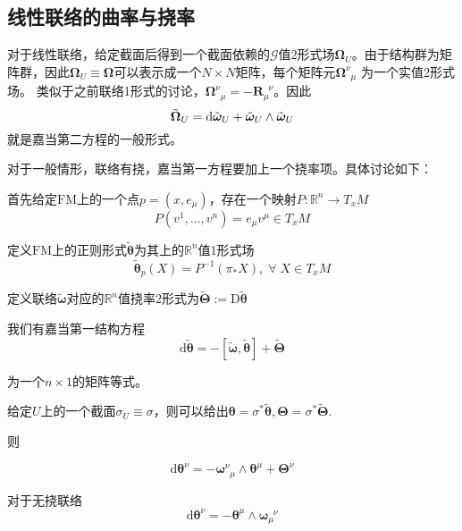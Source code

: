 \documentclass{ctexbook}
\begin{document}
\subsection{线性联络的曲率与挠率}

对于线性联络，给定截面后得到一个截面依赖的$\mathscr{G}$值2形式场$\bm{\Omega}_U$。由于结构群为矩阵群，因此$\bm{\Omega}_U\equiv\bm{\Omega}$可以表示成一个$N\times N$矩阵，每个矩阵元$\bm{\Omega}^{\nu}_{\;\;\mu}$ 为一个实值2形式场。 类似于之前联络1形式的讨论，$\bm{\Omega}^{\nu}_{\;\;\mu}=-\bm{R}_{\mu}^{\;\;\nu}$。因此
\[\tilde{\bm{\Omega}}_U=\mathrm{d}\tilde{\bm{\omega}}_U+\tilde{\bm{\omega}}_U\wedge\tilde{\bm{\omega}}_U\\\]就是嘉当第二方程的一般形式。

对于一般情形，联络有挠，嘉当第一方程要加上一个挠率项。具体讨论如下：

首先给定$\mathrm{FM}$上的一个点$p=(x,e_\mu)$，存在一个映射$P\colon\mathbb{R}^n\to T_x M$
\begin{equation}
    P(v^1,\dots,v^n)=e_\mu v^\mu\in T_x M
\end{equation}

定义$\mathrm{FM}$上的正则形式$\tilde{\bm{\theta}}$为其上的$\mathbb{R}^n$值1形式场
\begin{equation}
    \tilde{\bm{\theta}}_p(X)=P^{-1}(\pi_*X),\;\forall\;X\in T_x M
\end{equation}

定义联络$\tilde{\bm{\omega}}$对应的$\mathbb{R}^n$值挠率2形式为$\tilde{\bm{\Theta}}:=\mathrm{D}\tilde{\bm{\theta}}$

我们有嘉当第一结构方程
\begin{equation}
    \mathrm{d}\tilde{\bm{\theta}}=-\left[\tilde{\bm{\omega}},\tilde{\bm{\theta}}\right]+\tilde{\bm{\Theta}}
\end{equation}

为一个$n\times1$的矩阵等式。

给定$U$上的一个截面$\sigma_U\equiv\sigma$，则可以给出$\bm{\theta}=\sigma^{*}\tilde{\bm{\theta}},\bm{\Theta}=\sigma^{*}\tilde{\bm{\Theta}}$.

则

\begin{equation}
    \mathrm{d}\bm{\theta}^{\nu}=-\bm{\omega}^{\nu}_{\;\;\mu}\wedge\bm{\theta}^{\mu}+\bm{\Theta}^{\nu}
\end{equation}

对于无挠联络
\begin{equation}
    \mathrm{d}\bm{\theta}^{\nu}=-\bm{\theta}^{\mu}\wedge\bm{\omega}^{\;\;\nu}_{\mu}
\end{equation}
\end{document}
